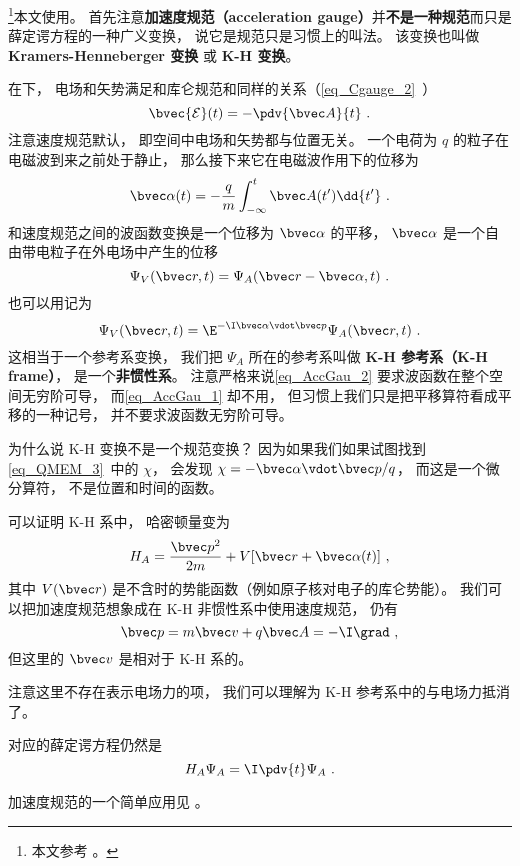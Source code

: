 

\footnote{本文参考 \cite{Bransden}。}本文使用。 首先注意\textbf{加速度规范（acceleration gauge）}并\textbf{不是一种规范}而只是薛定谔方程的一种广义变换， 说它是规范只是习惯上的叫法。 该变换也叫做 \textbf{Kramers-Henneberger 变换} 或 \textbf{K-H 变换}。

在下， 电场和矢势满足和库仑规范和同样的关系（\autoref{eq_Cgauge_2}~）
\begin{equation}\label{eq_AccGau_5}
\bvec {\mathcal{E}}(t) = -\pdv{\bvec A}{t}~.
\end{equation}
注意速度规范默认， 即空间中电场和矢势都与位置无关。 一个电荷为 $q$ 的粒子在电磁波到来之前处于静止， 那么接下来它在电磁波作用下的位移为
\begin{equation}\label{eq_AccGau_3}
\bvec \alpha(t) = -\frac{q}{m}\int_{-\infty}^t \bvec A(t') \dd{t'}~.
\end{equation}
和速度规范之间的波函数变换是一个位移为 $\bvec \alpha$ 的平移， $\bvec \alpha$ 是一个自由带电粒子在外电场中产生的位移
\begin{equation}\label{eq_AccGau_1}
\Psi_V(\bvec r, t) = \Psi_A(\bvec r - \bvec \alpha, t)~.
\end{equation}
也可以用记为
\begin{equation}\label{eq_AccGau_2}
\Psi_V(\bvec r, t) = \E^{-\I \bvec \alpha \vdot \bvec p} \Psi_A(\bvec r, t)~.
\end{equation}
这相当于一个参考系变换， 我们把 $\Psi_A$ 所在的参考系叫做 \textbf{K-H 参考系（K-H frame）}， 是一个\textbf{非惯性系}。 注意严格来说\autoref{eq_AccGau_2} 要求波函数在整个空间无穷阶可导， 而\autoref{eq_AccGau_1} 却不用， 但习惯上我们只是把平移算符看成平移的一种记号， 并不要求波函数无穷阶可导。

为什么说 K-H 变换不是一个规范变换？ 因为如果我们如果试图找到\autoref{eq_QMEM_3}~中的 $\chi$， 会发现 $\chi = -\bvec \alpha \vdot \bvec p/q$， 而这是一个微分算符， 不是位置和时间的函数。

可以证明 K-H 系中， 哈密顿量变为
\begin{equation}
H_A = \frac{\bvec p^2}{2m} + V[\bvec r + \bvec \alpha(t)]~,
\end{equation}
其中 $V(\bvec r)$ 是不含时的势能函数（例如原子核对电子的库仑势能）。 我们可以把加速度规范想象成在 K-H 非惯性系中使用速度规范， 仍有
\begin{equation}
\bvec p = m\bvec v + q\bvec A = -\I \grad~,
\end{equation}
但这里的 $\bvec v$ 是相对于 K-H 系的。

注意这里不存在表示电场力的项， 我们可以理解为 K-H 参考系中的与电场力抵消了。

对应的薛定谔方程仍然是
\begin{equation}\label{eq_AccGau_4}
H_A \Psi_A = \I \pdv{t} \Psi_A~.
\end{equation}


加速度规范的一个简单应用见 。
